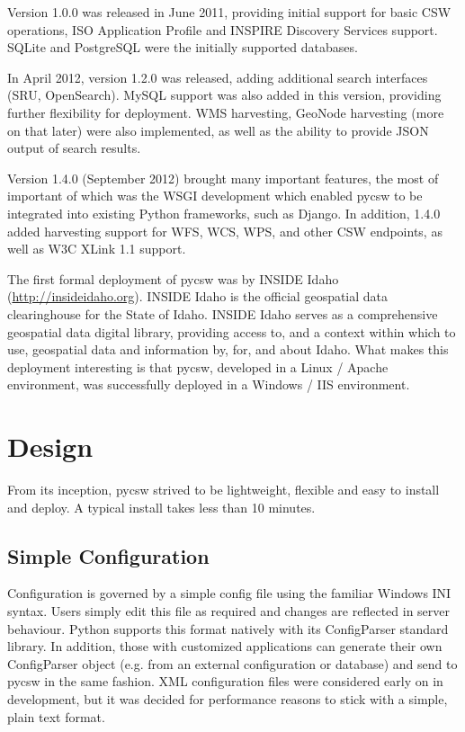 Version 1.0.0 was released in June 2011, providing initial support for basic CSW operations, ISO Application Profile and INSPIRE Discovery Services support.  SQLite and PostgreSQL were the initially supported databases.

In April 2012, version 1.2.0 was released, adding additional search interfaces (SRU, OpenSearch).  MySQL support was also added in this version, providing further flexibility for deployment.  WMS harvesting, GeoNode harvesting (more on that later) were also implemented, as well as the ability to provide JSON output of search results.

Version 1.4.0 (September 2012) brought many important features, the most of important of which was the WSGI development which enabled pycsw to be integrated into existing Python frameworks, such as Django.  In addition, 1.4.0 added harvesting support for WFS, WCS, WPS, and other CSW endpoints, as well as W3C XLink 1.1 support.

The first formal deployment of pycsw was by INSIDE Idaho (\url{http://insideidaho.org}).  
INSIDE Idaho is the official geospatial data clearinghouse for the  State of Idaho.  INSIDE Idaho serves as a comprehensive geospatial data digital library, providing access to, and a context within which to use, geospatial data and information by, for, and about Idaho. 
What makes this deployment interesting is that pycsw, developed in a Linux / Apache environment, was successfully deployed in a Windows / IIS environment.

\section{Design}
\label{sec:design}

From its inception, pycsw strived to be lightweight, flexible and easy to install and deploy.  A typical install takes less than 10 minutes.

\subsection{Simple Configuration}

Configuration is governed by a simple config file using the familiar Windows INI syntax.  Users simply edit this file as required and changes are reflected in server behaviour.  Python supports this format natively with its ConfigParser standard library.  In addition, those with customized applications can generate their own ConfigParser object (e.g. from an external configuration or database) and send to pycsw in the same fashion.  XML configuration files were considered early on in development, but it was decided for performance reasons to stick with a simple, plain text format.

